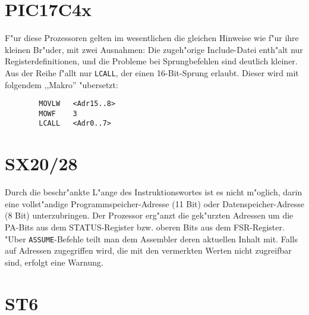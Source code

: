 \documentclass[12pt,a4paper,twoside]{report}
\newcommand{\tty}[1]{{\tt #1}}
\begin{document}

\section{PIC17C4x}

F"ur diese Prozessoren gelten im wesentlichen die gleichen Hinweise wie
f"ur ihre kleinen Br"uder, mit zwei Ausnahmen: Die zugeh"orige Include-Datei
enth"alt nur Registerdefinitionen, und die Probleme bei Sprungbefehlen
sind deutlich kleiner.  Aus der Reihe f"allt nur \tty{LCALL}, der einen
16-Bit-Sprung erlaubt.  Dieser wird mit folgendem ,,Makro'' "ubersetzt:
\begin{verbatim}
        MOVLW   <Adr15..8>
        MOWF    3
        LCALL   <Adr0..7>
\end{verbatim}


\section{SX20/28}

Durch die beschr"ankte L"ange des Instruktionswortes ist es nicht
m"oglich, darin eine vollst"andige Programmspeicher-Adresse (11 Bit)
oder Datenspeicher-Adresse (8 Bit) unterzubringen.  Der Prozessor
erg"anzt die gek"urzten Adressen um die PA-Bits aus dem
STATUS-Register bzw. oberen Bits aus dem FSR-Register.  "Uber
\tty{ASSUME}-Befehle teilt man dem Assembler deren aktuellen Inhalt
mit.  Falls auf Adressen zugegriffen wird, die mit den vermerkten
Werten nicht zugreifbar sind, erfolgt eine Warnung.


\section{ST6}
\end{document}
